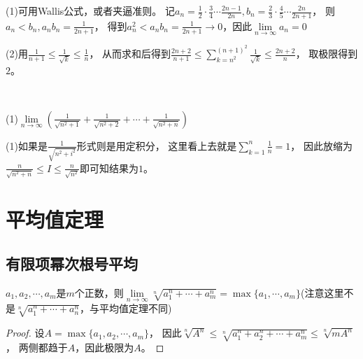 \begin{solution}
  (1)可用Wallis公式，或者夹逼准则。
  记$a_n = \frac{1}{2}\cdot \frac{3}{4} \cdots \frac{2n-1}{2n}, b_n = \frac{2}{3}\cdot \frac{4}{5}\cdots \frac{2n}{2n+1}$，
  则$a_n < b_n, a_nb_n = \frac{1}{2n+1}$，
  得到$a_n^2 < a_nb_n = \frac{1}{2n+1} \rightarrow 0$，因此$\lim \limits _{n \rightarrow \infty} a_n = 0$

  (2)用$\frac{1}{n+1} \leq \frac{1}{\sqrt{k}} \leq \frac{1}{n}$，
  从而求和后得到$\frac{2n+2}{n+1} \leq \sum\limits_{k = n^2}^{(n+1)^2} \frac{1}{\sqrt{k}} \leq \frac{2n+2}{n}$，
  取极限得到$2$。
\end{solution}

~

\begin{exercise}[整体放缩or局部放缩]
  (1)$\lim \limits _{n \rightarrow \infty} \left( \frac{1}{\sqrt{n^2 + 1}} + \frac{1}{\sqrt{n^2 + 2}} + \cdots + \frac{1}{\sqrt{n^2 + n}} \right)$

\end{exercise}

\begin{solution}
  (1)如果是$\frac{1}{\sqrt{n^2 + i^2}}$形式则是用定积分，
  这里看上去就是$\sum\limits_{k = 1}^n \frac{1}{n} = 1$，
  因此放缩为$\frac{n}{\sqrt{n^2 + n}} \leq I \leq \frac{n}{\sqrt{n^2}}$即可知结果为$1$。
\end{solution}

\section{平均值定理}

\subsection{有限项幂次根号平均}

\begin{theorem}[根号平均]
  $a_1,a_2,\cdots,a_m$是$m$个正数，则$\lim \limits _{n \rightarrow \infty} \sqrt[n]{a_1^n + \cdots + a_m^n} = \max \{a_1,\cdots,a_m\}$(注意这里不是$\sqrt[n]{a_1^n + \cdots + a_n^n}$，与平均值定理不同)
\end{theorem}

\begin{proof}
  设$A = \max \{a_1,a_2,\cdots,a_m\}$，
  因此$\sqrt[n]{A^n} \leq \sqrt[n]{a_1^n + a_2^n + \cdots + a_m^n} \leq \sqrt[n]{mA^n}$，
  两侧都趋于$A$，因此极限为$A$。
\end{proof}

~

